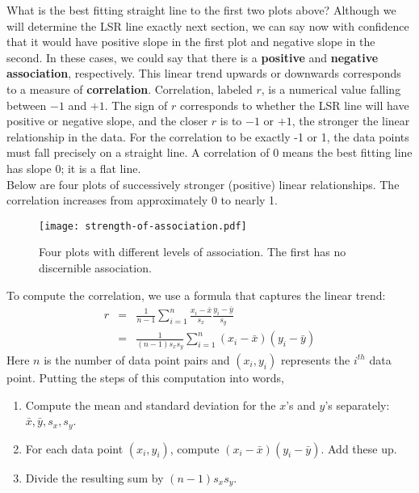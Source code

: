 What is the best fitting straight line to the first two plots above? Although we will determine the LSR line exactly next section, we can say now with confidence that it would have positive slope in the first plot and negative slope in the second. In these cases, we could say that there is a \textbf{positive} and \textbf{negative association}, respectively. This linear trend upwards or downwards corresponds to a measure of \textbf{correlation}. Correlation, labeled $r$, is a numerical value falling between $-1$ and $+1$. The sign of $r$ corresponds to whether the LSR line will have positive or negative slope, and the closer $r$ is to $-1$ or $+1$, the stronger the linear relationship in the data. For the correlation to be exactly -1 or 1, the data points must fall precisely on a straight line. A correlation of 0 means the best fitting line has slope 0; it is a flat line. \\

Below are four plots of successively stronger (positive) linear relationships. The correlation increases from approximately 0 to nearly 1.
\begin{figure}[htp]
\centering
\texttt{[image: strength-of-association.pdf]}
\caption{Four plots with different levels of association. The first has no discernible association.} %
\end{figure}

To compute the correlation, we use a formula that captures the linear trend:
\begin{eqnarray*}
r	&=& \frac{1}{n-1}\sum_{i=1}^n \frac{x_i - \bar{x}}{s_x}\frac{y_i - \bar{y}}{s_y} \\
	&=& \frac{1}{(n-1)s_x s_y}\sum_{i=1}^n(x_i - \bar{x})(y_i - \bar{y})
\end{eqnarray*}
Here $n$ is the number of data point pairs and $(x_i,y_i)$ represents the $i^{th}$ data point. Putting the steps of this computation into words,
\begin{enumerate}
\item Compute the mean and standard deviation for the $x$'s and $y$'s separately: $\bar{x},\bar{y},s_x,s_y$.
\item For each data point $(x_i,y_i)$, compute $(x_i-\bar{x})(y_i-\bar{y})$. Add these up.
\item Divide the resulting sum by $(n-1)s_xs_y$.
\end{enumerate}

